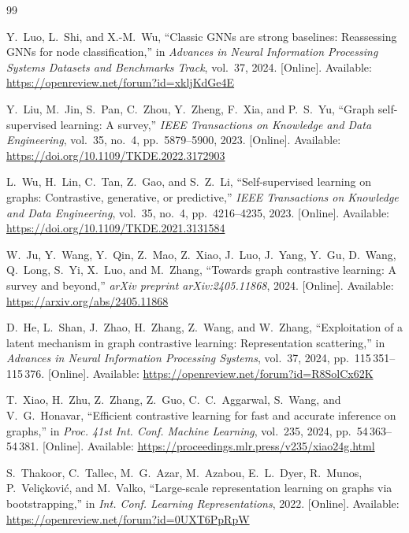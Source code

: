 \documentclass[conference]{IEEEtran}
\begin{document}
\clearpage
\begin{thebibliography}{99}

Y.~Luo, L.~Shi, and X.-M.~Wu, ``Classic {GNN}s are strong baselines: Reassessing {GNN}s for node classification,'' in \emph{Advances in Neural Information Processing Systems Datasets and Benchmarks Track}, vol.~37, 2024. [Online]. Available: \url{https://openreview.net/forum?id=xkljKdGe4E}

Y.~Liu, M.~Jin, S.~Pan, C.~Zhou, Y.~Zheng, F.~Xia, and P.~S.~Yu, ``Graph self-supervised learning: A survey,'' \emph{IEEE Transactions on Knowledge and Data Engineering}, vol.~35, no.~4, pp.~5879--5900, 2023. [Online]. Available: \url{https://doi.org/10.1109/TKDE.2022.3172903}

L.~Wu, H.~Lin, C.~Tan, Z.~Gao, and S.~Z.~Li, ``Self-supervised learning on graphs: Contrastive, generative, or predictive,'' \emph{IEEE Transactions on Knowledge and Data Engineering}, vol.~35, no.~4, pp.~4216--4235, 2023. [Online]. Available: \url{https://doi.org/10.1109/TKDE.2021.3131584}

W.~Ju, Y.~Wang, Y.~Qin, Z.~Mao, Z.~Xiao, J.~Luo, J.~Yang, Y.~Gu, D.~Wang, Q.~Long, S.~Yi, X.~Luo, and M.~Zhang, ``Towards graph contrastive learning: A survey and beyond,'' \emph{arXiv preprint arXiv:2405.11868}, 2024. [Online]. Available: \url{https://arxiv.org/abs/2405.11868}

D.~He, L.~Shan, J.~Zhao, H.~Zhang, Z.~Wang, and W.~Zhang, ``Exploitation of a latent mechanism in graph contrastive learning: Representation scattering,'' in \emph{Advances in Neural Information Processing Systems}, vol.~37, 2024, pp.~115\,351--115\,376. [Online]. Available: \url{https://openreview.net/forum?id=R8SolCx62K}

T.~Xiao, H.~Zhu, Z.~Zhang, Z.~Guo, C.~C.~Aggarwal, S.~Wang, and V.~G.~Honavar, ``Efficient contrastive learning for fast and accurate inference on graphs,'' in \emph{Proc. 41st Int. Conf. Machine Learning}, vol.~235, 2024, pp.~54\,363--54\,381. [Online]. Available: \url{https://proceedings.mlr.press/v235/xiao24g.html}

S.~Thakoor, C.~Tallec, M.~G.~Azar, M.~Azabou, E.~L.~Dyer, R.~Munos, P.~Veli{\c{c}}kovi{\'c}, and M.~Valko, ``Large-scale representation learning on graphs via bootstrapping,'' in \emph{Int. Conf. Learning Representations}, 2022. [Online]. Available: \url{https://openreview.net/forum?id=0UXT6PpRpW}


\end{thebibliography}
\end{document}
